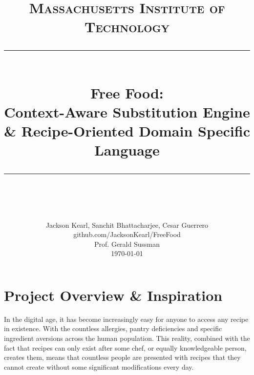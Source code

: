 \newcommand{\horrule}[1]{\rule{\linewidth}{#1}} 	%
\newcommand{\code}[1]{\texttt{#1}}

\title{
		\normalfont \normalsize \textsc{Massachusetts Institute of Technology} \\ [25pt]
		\horrule{0.5pt} \\[0.4cm]
		\huge Free Food: \\Context-Aware Substitution Engine \& Recipe-Oriented Domain Specific Language \\
		\horrule{2pt} \\[0.5cm]
}
\author{
		\normalfont 								\normalsize
        Jackson Kearl, Sanchit Bhattacharjee, Cesar Guerrero\\[-3pt]		\normalsize
        github.com/JacksonKearl/FreeFood \\[-3pt] \normalsize
        Prof. Gerald Sussman \\[-3pt] \normalsize
        \today \\\normalsize
}
\date{}



\maketitle















\newpage
\section{Project Overview \& Inspiration}
\paragraph{}
In the digital age, it has become increasingly easy for anyone to access any recipe in existence. With the countless allergies, pantry deficiencies and specific ingredient aversions across the human population. This reality, combined with the fact that recipes can only exist after some chef, or equally knowledgeable person, creates them, means that countless people are presented with recipes that they cannot create without some significant modifications every day.

